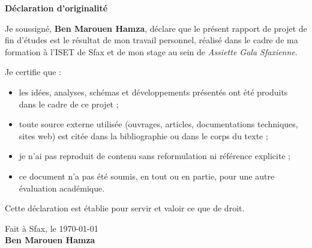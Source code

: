 \newpage
\thispagestyle{plain}

\begin{center}
    {\Large \textbf{Déclaration d'originalité}}\\[1.2cm]
\end{center}

Je soussigné, \textbf{Ben Marouen Hamza}, déclare que le présent rapport de projet de fin d'études est le résultat de mon travail personnel, réalisé dans le cadre de ma formation à l'ISET de Sfax et de mon stage au sein de \textit{Assiette Gala Sfaxienne}.

Je certifie que :
\begin{itemize}
    \item les idées, analyses, schémas et développements présentés ont été produits dans le cadre de ce projet ;
    \item toute source externe utilisée (ouvrages, articles, documentations techniques, sites web) est citée dans la bibliographie ou dans le corps du texte ;
    \item je n'ai pas reproduit de contenu sans reformulation ni référence explicite ;
    \item ce document n'a pas été soumis, en tout ou en partie, pour une autre évaluation académique.
\end{itemize}

Cette déclaration est établie pour servir et valoir ce que de droit.

\vspace{1.5cm}

\begin{flushright}
Fait à Sfax, le \today\\[0.8cm]
\textbf{Ben Marouen Hamza}
\end{flushright}

\clearpage
